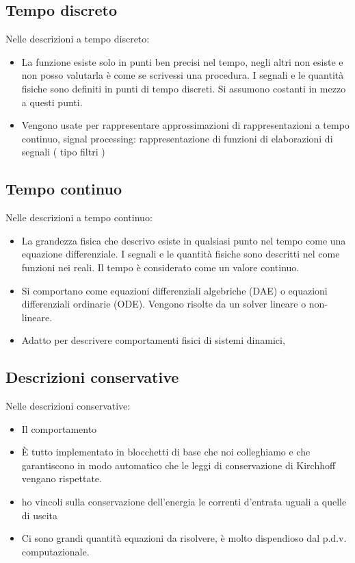 \documentclass[a4paper]{article}
\begin{document}
		\subsection{Tempo discreto} 
		Nelle descrizioni a tempo discreto:
		\begin{itemize}
			\item La funzione esiste solo in punti ben precisi nel tempo, negli altri non esiste e non posso valutarla
			è come se scrivessi una procedura. I segnali e le quantità fisiche sono definiti in punti di tempo discreti. Si assumono costanti in mezzo a questi punti.
			\item Vengono usate per rappresentare approssimazioni di rappresentazioni a tempo continuo, 
			signal processing: rappresentazione di funzioni di elaborazioni di segnali ( tipo filtri )
		\end{itemize}
		
		
		\subsection{Tempo continuo}
		Nelle descrizioni a tempo continuo:
		\begin{itemize}
			\item La grandezza fisica che descrivo esiste in qualsiasi punto nel tempo
			come una equazione differenziale. I segnali e le quantità fisiche sono descritti nel come funzioni nei reali. Il tempo è considerato come un valore continuo.
			\item Si comportano come equazioni differenziali algebriche (DAE) o equazioni differenziali ordinarie (ODE). Vengono risolte da un solver lineare o non-lineare.
			\item Adatto per descrivere comportamenti fisici di sistemi dinamici,
		\end{itemize}
		
		\subsection{Descrizioni conservative}
		Nelle descrizioni conservative:
		\begin{itemize}
			\item Il comportamento 
			\item È tutto implementato in blocchetti di base che noi colleghiamo e che garantiscono in modo automatico che le leggi di conservazione di Kirchhoff vengano rispettate.
			\item ho vincoli sulla conservazione dell'energia
			le correnti d'entrata uguali a quelle di uscita
			\item Ci sono grandi quantità equazioni da risolvere, è molto dispendioso dal p.d.v. computazionale.
		\end{itemize}
		
\end{document}
